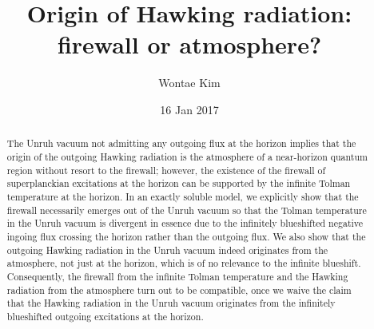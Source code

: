 \documentclass[aps,a4paper,showpacs,showkeys,superscriptaddress,12pt]{revtex4-1}
\begin{document}

\title{Origin of Hawking radiation: firewall or atmosphere?}



\author{Wontae Kim}%
%
%



\date{16 Jan 2017}

\begin{abstract}
The Unruh vacuum not admitting any outgoing flux at the horizon implies that
the origin of the outgoing Hawking radiation is the atmosphere of a near-horizon quantum
region without resort to the firewall; however,
the existence of the firewall of superplanckian excitations at the horizon
can be supported by the infinite Tolman temperature at the horizon.
In an exactly soluble model,
we explicitly show that the firewall necessarily emerges out of the Unruh vacuum
so that the Tolman temperature in the Unruh vacuum is divergent
in essence due to the infinitely blueshifted negative ingoing flux crossing the horizon
rather than the outgoing flux.
We also show that
the outgoing Hawking radiation in the Unruh vacuum indeed originates from the atmosphere,
not just at the horizon, which is of no relevance to the infinite blueshift.
Consequently, the firewall from the infinite Tolman temperature
and the Hawking radiation from the atmosphere turn out to be compatible,
once we waive the claim that the Hawking radiation in the Unruh vacuum originates from the infinitely blueshifted
outgoing excitations at the horizon.

\end{abstract}



\maketitle
\end{document}
